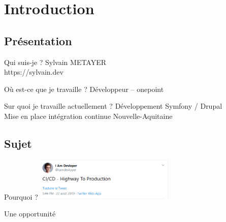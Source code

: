 \section{Introduction}

\subsection{Présentation}

\begin{frame}{\subsecname}
	\begin{block}{Qui suis-je ?}
	Sylvain METAYER \\ 
	https://sylvain.dev
	\end{block}
	\pause
	\begin{block}{Où est-ce que je travaille ?}
	Développeur -- onepoint
	\end{block}
	\pause
	\begin{block}{Sur quoi je travaille actuellement ?}
	Développement Symfony / Drupal\\ 	
	Mise en place intégration continue Nouvelle-Aquitaine
	\end{block}
\end{frame}

\subsection{Sujet}
\begin{frame}{\subsecname}
		\begin{block}{Pourquoi ?}
		\centering \includegraphics[width=0.5\textwidth]{img/highway-ci.png}
		\end{block}
		\pause
		\begin{block}{Une opportunité}
		\end{block}
\end{frame}
